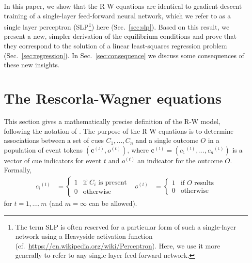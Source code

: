 \documentclass[a4paper,11pt]{article} %
\newcommand{\psup}[1]{\ensuremath{^{(#1)}}}
\newcommand{\psupt}{\psup{t}}
\begin{document}
In this paper, we show that the R-W equations are identical to gradient-descent training of a single-layer feed-forward neural network, which we refer to as a single layer perceptron (SLP\footnote{The term SLP is often reserved for a particular form of such a single-layer network using a Heavyside activation function (cf.\ \url{https://en.wikipedia.org/wiki/Perceptron}).  Here, we use it more generally to refer to any single-layer feed-forward network.}) here (Sec.~\ref{sec:slp}). Based on this result, we present a new, simpler derivation of the equilibrium conditions \citep{Danks:03} and prove that they correspond to the solution of a linear least-squares regression problem (Sec.~\ref{sec:regression}).  In Sec.~\ref{sec:consequence} we discuss some consequences of these new insights.

\section{The Rescorla-Wagner equations}
\label{sec:math-def}

This section gives a mathematically precise definition of the R-W model, following the notation of \citet{Danks:03}.  The purpose of the R-W equations is to determine associations between a set of cues $C_1, \ldots, C_n$ and a single outcome $O$ in a population of event tokens $(\mathbf{c}\psupt, o\psupt)$, where $\mathbf{c}\psupt = (c_1\psupt, \ldots, c_n\psupt)$ is a vector of cue indicators for event $t$ and $o\psupt$ an indicator for the outcome $O$.  Formally,
\begin{align}
  \label{eq:def-c-o}
  c_i\psupt &= 
  \begin{cases}
    1 & \text{if $C_i$ is present} \\
    0 & \text{otherwise}
  \end{cases}
  &
  o\psupt &= 
  \begin{cases}
    1 & \text{if $O$ results} \\
    0 & \text{otherwise}
  \end{cases}
\end{align}
for $t = 1, \ldots, m$ (and $m = \infty$ can be allowed).
\end{document}
